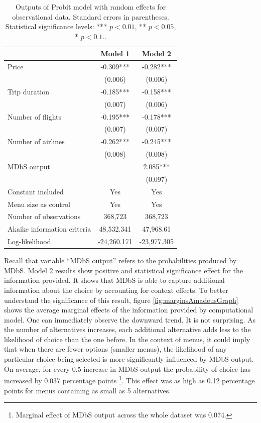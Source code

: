 \documentclass[a4paper,12pt]{article}
\begin{document}
\begin{table}
    \centering

    \begin{tabular}{lcc}
    \hline
     & Model 1 & Model 2 \\
    \hline
    Price & -0.309*** & -0.282*** \\
     & (0.006) & (0.006) \\[1ex]
    Trip duration & -0.185*** & -0.158*** \\
     & (0.007) & (0.006) \\[1ex]
    Number of flights & -0.195*** & -0.178*** \\
     & (0.007) & (0.007) \\[1ex]
    Number of airlines & -0.262*** & -0.245*** \\
     & (0.008) & (0.008) \\[1ex]
    MDbS output & & 2.085*** \\
     & & (0.097) \\[1ex]
    Constant included & Yes & Yes \\[1ex]
    Menu size as control & Yes & Yes \\[1ex]
    Number of observations & 368,723 & 368,723 \\[1ex]
    Akaike information criteria & 48,532.341 & 47,968.61 \\[1ex]
    Log-likelihood & -24,260.171 & -23,977.305 \\[1ex]
    \hline
    \end{tabular}
    \caption[Outputs of Probit model for observational data]{Outputs of Probit model with random effects for observational data. Standard errors in parentheses. Statistical significance levels: *** $p<0.01$, ** $p<0.05$, * $p<0.1.$.}
    \label{tab:amadeusProbitResults}
\end{table}

Recall that variable ``MDbS output'' refers to the probabilities produced by MDbS. Model 2 results show positive and statistical significance effect for the information provided. It shows that MDbS is able to capture additional information about the choice by accounting for context effects. To better understand the significance of this result, figure \ref{fig:marginsAmadeusGraph} shows the average marginal effects of the information provided by computational model. One can immediately observe the downward trend. It is not surprising. As the number of alternatives increases, each additional alternative adds less to the likelihood of choice than the one before. In the context of menus, it could imply that when there are fewer options (smaller menus), the likelihood of any particular choice being selected is more significantly influenced by MDbS output. On average, for every 0.5 increase in MDbS output the probability of choice has increased by 0.037 percentage points \footnote{Marginal effect of MDbS output across the whole dataset was 0.074.}. This effect was as high as 0.12 percentage points for menus containing as small as 5 alternatives. 
\end{document}
